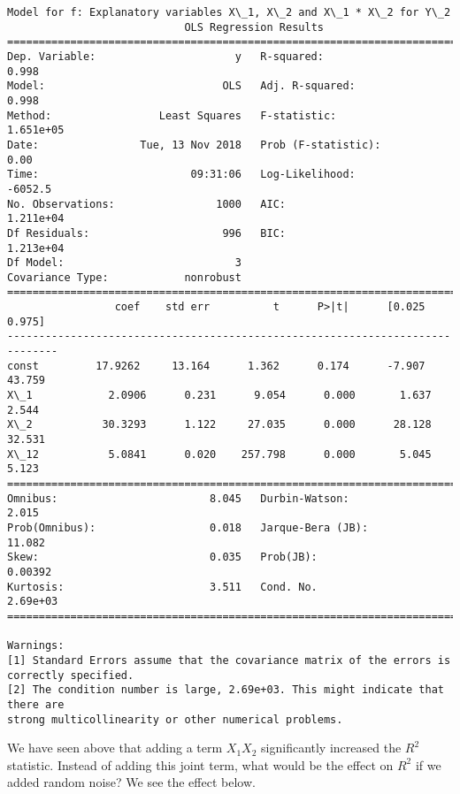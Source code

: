 \documentclass[11pt]{article}
\begin{document}
    \begin{Verbatim}[commandchars=\\\{\}]
Model for f: Explanatory variables X\_1, X\_2 and X\_1 * X\_2 for Y\_2
                            OLS Regression Results                            
==============================================================================
Dep. Variable:                      y   R-squared:                       0.998
Model:                            OLS   Adj. R-squared:                  0.998
Method:                 Least Squares   F-statistic:                 1.651e+05
Date:                Tue, 13 Nov 2018   Prob (F-statistic):               0.00
Time:                        09:31:06   Log-Likelihood:                -6052.5
No. Observations:                1000   AIC:                         1.211e+04
Df Residuals:                     996   BIC:                         1.213e+04
Df Model:                           3                                         
Covariance Type:            nonrobust                                         
==============================================================================
                 coef    std err          t      P>|t|      [0.025      0.975]
------------------------------------------------------------------------------
const         17.9262     13.164      1.362      0.174      -7.907      43.759
X\_1            2.0906      0.231      9.054      0.000       1.637       2.544
X\_2           30.3293      1.122     27.035      0.000      28.128      32.531
X\_12           5.0841      0.020    257.798      0.000       5.045       5.123
==============================================================================
Omnibus:                        8.045   Durbin-Watson:                   2.015
Prob(Omnibus):                  0.018   Jarque-Bera (JB):               11.082
Skew:                           0.035   Prob(JB):                      0.00392
Kurtosis:                       3.511   Cond. No.                     2.69e+03
==============================================================================

Warnings:
[1] Standard Errors assume that the covariance matrix of the errors is correctly specified.
[2] The condition number is large, 2.69e+03. This might indicate that there are
strong multicollinearity or other numerical problems.

    \end{Verbatim}

    We have seen above that adding a term \(X_1 X_2\) significantly
increased the \(R^2\) statistic. Instead of adding this joint term, what
would be the effect on \(R^2\) if we added random noise? We see the
effect below.
\end{document}
